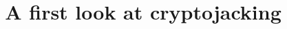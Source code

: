 \documentclass[10pt, conference, compsocconf]{IEEEtran}
\begin{document}
\title{A first look at cryptojacking}
\author{}
\maketitle




\IEEEpeerreviewmaketitle






\footnotesize

\normalsize

\end{document}
